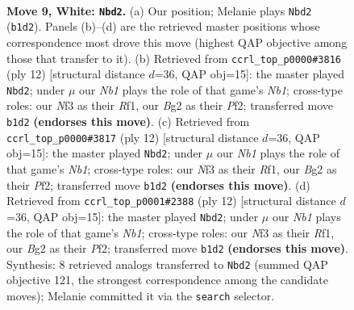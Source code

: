 \documentclass[11pt]{article}
\begin{document}
\clearpage

\begin{figure}[p]\centering
\begin{subfigure}{0.46\textwidth}\centering
\resizebox{\linewidth}{!}{%
\newchessgame
\chessboard[
  setfen={rnbq1rk1/pp4pp/2pb1n2/3p1p2/3P4/5NP1/PP2PPBP/RNBQR1K1 w - - 2 9},
  showmover=false,
  pgfstyle=straightmove, color=movearrow, markmove={b1-d2}
]}
\caption{}
\end{subfigure}\hfill
\begin{subfigure}{0.46\textwidth}\centering
\resizebox{\linewidth}{!}{%
\newchessgame
\chessboard[
  setfen={rnbq1rk1/ppp1b1pp/4pn2/3p1p2/2PP4/5NP1/PP2PPBP/RNBQ1RK1 w - - 0 7},
  showmover=false,
  pgfstyle=straightmove, color=movearrow, markmove={b1-d2}
]}
\caption{}
\end{subfigure}
\\[4pt]
\begin{subfigure}{0.46\textwidth}\centering
\resizebox{\linewidth}{!}{%
\newchessgame
\chessboard[
  setfen={rnbq1rk1/ppp1b1pp/4pn2/3p1p2/2PP4/5NP1/PP2PPBP/RNBQ1RK1 w - - 0 7},
  showmover=false,
  pgfstyle=straightmove, color=movearrow, markmove={b1-d2}
]}
\caption{}
\end{subfigure}\hfill
\begin{subfigure}{0.46\textwidth}\centering
\resizebox{\linewidth}{!}{%
\newchessgame
\chessboard[
  setfen={rnbq1rk1/ppp1b1pp/4pn2/3p1p2/2PP4/5NP1/PP2PPBP/RNBQ1RK1 w - - 0 7},
  showmover=false,
  pgfstyle=straightmove, color=movearrow, markmove={b1-d2}
]}
\caption{}
\end{subfigure}
\caption{\textbf{Move 9, White: \texttt{Nbd2}.} (a) Our position; Melanie plays \texttt{Nbd2} (\texttt{b1d2}). Panels (b)--(d) are the retrieved master positions whose correspondence most drove this move (highest QAP objective among those that transfer to it). (b) Retrieved from \texttt{ccrl\_top\_p0000\#3816} (ply 12) [structural distance $d$=36, QAP obj=15]: the master played \texttt{Nbd2}; under $\mu$ our \emph{Nb1} plays the role of that game's \emph{Nb1}; cross-type roles: our \emph{N}f3 as their \emph{R}f1, our \emph{B}g2 as their \emph{P}f2; transferred move \texttt{b1d2} \textbf{(endorses this move)}. (c) Retrieved from \texttt{ccrl\_top\_p0000\#3817} (ply 12) [structural distance $d$=36, QAP obj=15]: the master played \texttt{Nbd2}; under $\mu$ our \emph{Nb1} plays the role of that game's \emph{Nb1}; cross-type roles: our \emph{N}f3 as their \emph{R}f1, our \emph{B}g2 as their \emph{P}f2; transferred move \texttt{b1d2} \textbf{(endorses this move)}. (d) Retrieved from \texttt{ccrl\_top\_p0001\#2388} (ply 12) [structural distance $d$=36, QAP obj=15]: the master played \texttt{Nbd2}; under $\mu$ our \emph{Nb1} plays the role of that game's \emph{Nb1}; cross-type roles: our \emph{N}f3 as their \emph{R}f1, our \emph{B}g2 as their \emph{P}f2; transferred move \texttt{b1d2} \textbf{(endorses this move)}. Synthesis: 8 retrieved analogs transferred to \texttt{Nbd2} (summed QAP objective 121, the strongest correspondence among the candidate moves); Melanie committed it via the \texttt{search} selector.}
\label{fig:thought-m16}
\end{figure}
\end{document}
